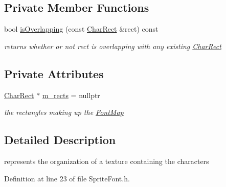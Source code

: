 \subsection*{Private Member Functions}
\begin{DoxyCompactItemize}
\item 
\mbox{\label{classnta_1_1FontMap_aae874cb1975e6be920bf785f34f14c3e}} 
bool \hyperlink{classnta_1_1FontMap_aae874cb1975e6be920bf785f34f14c3e}{is\+Overlapping} (const \hyperlink{structnta_1_1FontMap_1_1CharRect}{Char\+Rect} \&rect) const
\begin{DoxyCompactList}\small\item\em returns whether or not rect is overlapping with any existing \hyperlink{structnta_1_1FontMap_1_1CharRect}{Char\+Rect} \end{DoxyCompactList}\end{DoxyCompactItemize}
\subsection*{Private Attributes}
\begin{DoxyCompactItemize}
\item 
\mbox{\label{classnta_1_1FontMap_a24e415fd025230fce6a304a3dfd320a8}} 
\hyperlink{structnta_1_1FontMap_1_1CharRect}{Char\+Rect} $\ast$ \hyperlink{classnta_1_1FontMap_a24e415fd025230fce6a304a3dfd320a8}{m\+\_\+rects} = nullptr
\begin{DoxyCompactList}\small\item\em the rectangles making up the \hyperlink{classnta_1_1FontMap}{Font\+Map} \end{DoxyCompactList}\end{DoxyCompactItemize}


\subsection{Detailed Description}
represents the organization of a texture containing the characters 

Definition at line 23 of file Sprite\+Font.\+h.



